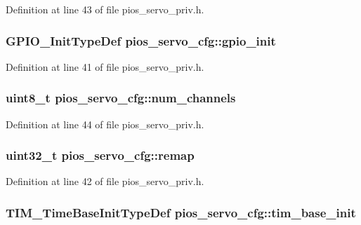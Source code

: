 \-Definition at line 43 of file pios\-\_\-servo\-\_\-priv.\-h.

\hypertarget{structpios__servo__cfg_a41b9d93e4e94a3a0c5e40a4e42c6d117}{
\subsubsection[{gpio\-\_\-init}]{\setlength{\rightskip}{0pt plus 5cm}\-G\-P\-I\-O\-\_\-\-Init\-Type\-Def {\bf pios\-\_\-servo\-\_\-cfg\-::gpio\-\_\-init}}}\label{structpios__servo__cfg_a41b9d93e4e94a3a0c5e40a4e42c6d117}


\-Definition at line 41 of file pios\-\_\-servo\-\_\-priv.\-h.

\hypertarget{structpios__servo__cfg_a94528872c23ad53d65dfb81ab86790fd}{
\subsubsection[{num\-\_\-channels}]{\setlength{\rightskip}{0pt plus 5cm}uint8\-\_\-t {\bf pios\-\_\-servo\-\_\-cfg\-::num\-\_\-channels}}}\label{structpios__servo__cfg_a94528872c23ad53d65dfb81ab86790fd}


\-Definition at line 44 of file pios\-\_\-servo\-\_\-priv.\-h.

\hypertarget{structpios__servo__cfg_a01880688c4a5e40c514d26c4d64e5efe}{
\subsubsection[{remap}]{\setlength{\rightskip}{0pt plus 5cm}uint32\-\_\-t {\bf pios\-\_\-servo\-\_\-cfg\-::remap}}}\label{structpios__servo__cfg_a01880688c4a5e40c514d26c4d64e5efe}


\-Definition at line 42 of file pios\-\_\-servo\-\_\-priv.\-h.

\hypertarget{structpios__servo__cfg_afd81686ed67be0c809afa058df95ad44}{
\subsubsection[{tim\-\_\-base\-\_\-init}]{\setlength{\rightskip}{0pt plus 5cm}\-T\-I\-M\-\_\-\-Time\-Base\-Init\-Type\-Def {\bf pios\-\_\-servo\-\_\-cfg\-::tim\-\_\-base\-\_\-init}}}\label{structpios__servo__cfg_afd81686ed67be0c809afa058df95ad44}


